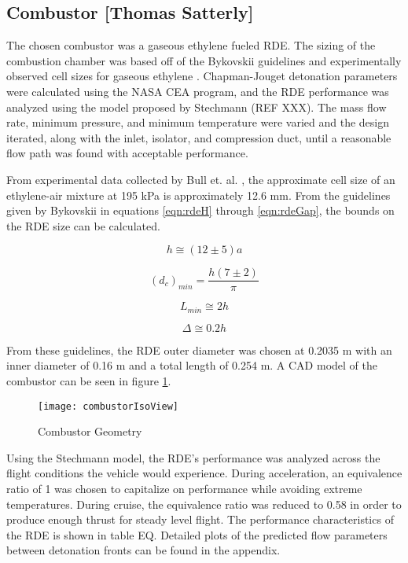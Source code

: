 \subsection{Combustor [Thomas Satterly]}
The chosen combustor was a gaseous ethylene fueled RDE. The sizing of the combustion chamber was based off of the Bykovskii \cite{bykovskii} guidelines and experimentally observed cell sizes for gaseous ethylene \cite{cellsize}. Chapman-Jouget detonation parameters were calculated using the NASA CEA program, and the RDE performance was analyzed using the model proposed by Stechmann (REF XXX). The mass flow rate, minimum pressure, and minimum temperature were varied and the design iterated, along with the inlet, isolator, and compression duct, until a reasonable flow path was found with acceptable performance. 

From experimental data collected by Bull et. al. \cite{cellsize}, the approximate cell size of an ethylene-air mixture at 195 kPa is approximately 12.6 mm. From the guidelines given by Bykovskii in equations \ref{eqn:rdeH} through \ref{eqn:rdeGap}, the bounds on the RDE size can be calculated.

\begin{equation}
h\cong(12\pm5)a
\label{eqn:rdeH}
\end{equation}

\begin{equation}
(d_c)_{min}=\frac{h(7\pm2)}{\pi}
\label{eqn:rdeDia}
\end{equation}

\begin{equation}
L_{min}\cong2h
\label{eqn:rdeLength}
\end{equation}

\begin{equation}
\Delta\cong0.2h
\label{eqn:rdeGap}
\end{equation}

    From these guidelines, the RDE outer diameter was chosen at 0.2035 m with an inner diameter of 0.16 m and a total length of 0.254 m. A CAD model of the combustor can be seen in figure \ref{fig:combustorIsoView}.

\begin{figure}[H]
\begin{center}
\texttt{[image: combustorIsoView]}
\caption{Combustor Geometry}
\label{fig:combustorIsoView}
\end{center}
\end{figure}

    Using the Stechmann model, the RDE’s performance was analyzed across the flight conditions the vehicle would experience. During acceleration, an equivalence ratio of 1 was chosen to capitalize on performance while avoiding extreme temperatures. During cruise, the equivalence ratio was reduced to 0.58 in order to produce enough thrust for steady level flight. The performance characteristics of the RDE is shown in table EQ. Detailed plots of the predicted flow parameters between detonation fronts can be found in the appendix.

